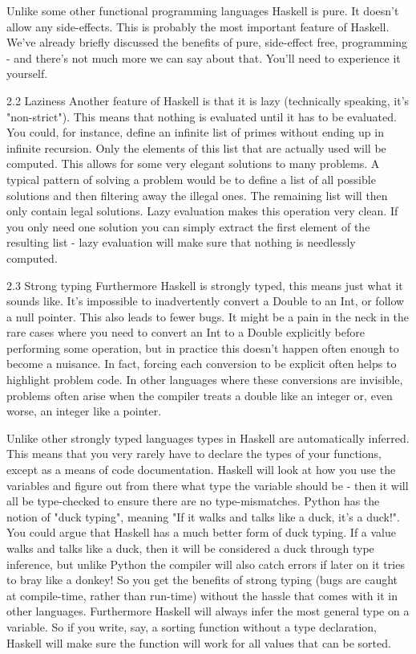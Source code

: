 \documentclass{report}
\begin{document}
Unlike some other functional programming languages Haskell is pure. It doesn't allow any side-effects. This is probably the most important feature of Haskell. We've already briefly discussed the benefits of pure, side-effect free, programming - and there's not much more we can say about that. You'll need to experience it yourself.

2.2 Laziness
Another feature of Haskell is that it is lazy (technically speaking, it's "non-strict"). This means that nothing is evaluated until it has to be evaluated. You could, for instance, define an infinite list of primes without ending up in infinite recursion. Only the elements of this list that are actually used will be computed. This allows for some very elegant solutions to many problems. A typical pattern of solving a problem would be to define a list of all possible solutions and then filtering away the illegal ones. The remaining list will then only contain legal solutions. Lazy evaluation makes this operation very clean. If you only need one solution you can simply extract the first element of the resulting list - lazy evaluation will make sure that nothing is needlessly computed.

2.3 Strong typing
Furthermore Haskell is strongly typed, this means just what it sounds like. It's impossible to inadvertently convert a Double to an Int, or follow a null pointer. This also leads to fewer bugs. It might be a pain in the neck in the rare cases where you need to convert an Int to a Double explicitly before performing some operation, but in practice this doesn't happen often enough to become a nuisance. In fact, forcing each conversion to be explicit often helps to highlight problem code. In other languages where these conversions are invisible, problems often arise when the compiler treats a double like an integer or, even worse, an integer like a pointer.

Unlike other strongly typed languages types in Haskell are automatically inferred. This means that you very rarely have to declare the types of your functions, except as a means of code documentation. Haskell will look at how you use the variables and figure out from there what type the variable should be - then it will all be type-checked to ensure there are no type-mismatches. Python has the notion of "duck typing", meaning "If it walks and talks like a duck, it's a duck!". You could argue that Haskell has a much better form of duck typing. If a value walks and talks like a duck, then it will be considered a duck through type inference, but unlike Python the compiler will also catch errors if later on it tries to bray like a donkey! So you get the benefits of strong typing (bugs are caught at compile-time, rather than run-time) without the hassle that comes with it in other languages. Furthermore Haskell will always infer the most general type on a variable. So if you write, say, a sorting function without a type declaration, Haskell will make sure the function will work for all values that can be sorted.
\end{document}
